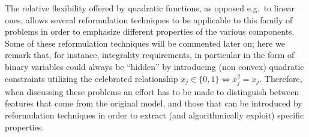 The relative flexibility offered by quadratic functions, as opposed e.g.~to linear ones, allows several reformulation techniques to be applicable to this family of problems in order to emphasize different properties of the various components. Some of these reformulation techniques will be commented later on; here we remark that, for instance, integrality requirements, in particular in the form of binary variables could always be ``hidden'' by introducing (non convex) quadratic constraints utilizing the celebrated relationship $x_j \in \{0, 1\} \iff x_j^2 = x_j$. Therefore, when discussing these problems an effort has to be made to distinguish between features that come from the original model, and those that can be introduced by reformulation techniques in order to extract (and algorithmically exploit) specific properties.

